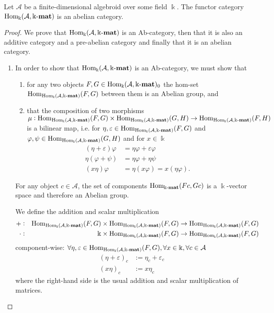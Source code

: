 \begin{theorem}\label{thm:functor_category_abelian}
Let $\mathcal{A}$ be a finite-dimensional algebroid over some field $\Bbbk$. The functor category $\mathrm{Hom_{\Bbbk}}(\mathcal{A},\Bbbk\textnormal{-}\mathbf{mat})$
is an abelian category.
\end{theorem}
\begin{proof}
We prove that $\mathrm{Hom_{\Bbbk}}(\mathcal{A},\Bbbk\textnormal{-}\mathbf{mat})$ is an Ab-category, then that it is also an additive category and a pre-abelian category and finally that
it is an abelian category.
\begin{enumerate}
\renewcommand{\labelenumi}{(\theenumi)}
\item In order to show that $\mathrm{Hom_{\Bbbk}}(\mathcal{A},\Bbbk\textnormal{-}\mathbf{mat})$ is an Ab-category, we must show that 
\begin{enumerate}
\renewcommand{\labelenumii}{(\roman{enumii})}
\item for any two objects $F,G \in \mathrm{Hom_{\Bbbk}}(\mathcal{A},\Bbbk\textnormal{-}\mathbf{mat})_{0}$ the hom-set $\mathrm{Hom}_{\mathrm{Hom_{\Bbbk}}(\mathcal{A},\Bbbk\textnormal{-}\mathbf{mat})}(F,G)$ between them is an Abelian group, and
\item that the composition of two morphisms\\
$\mu : \mathrm{Hom}_{\mathrm{Hom_{\Bbbk}}(\mathcal{A},\Bbbk\textnormal{-}\mathbf{mat})}(F,G) \times \mathrm{Hom}_{\mathrm{Hom_{\Bbbk}}(\mathcal{A},\Bbbk\textnormal{-}\mathbf{mat})}(G,H) \rightarrow \mathrm{Hom}_{\mathrm{Hom_{\Bbbk}}(\mathcal{A},\Bbbk\textnormal{-}\mathbf{mat})}(F,H)$ is a
bilinear map, i.e. for $\eta, \varepsilon \in \mathrm{Hom}_{\mathrm{Hom_{\Bbbk}}(\mathcal{A},\Bbbk\textnormal{-}\mathbf{mat})}(F,G)$ and $\varphi, \psi \in \mathrm{Hom}_{\mathrm{Hom_{\Bbbk}}(\mathcal{A},\Bbbk\textnormal{-}\mathbf{mat})}(G,H)$ and
for $x \in \Bbbk$
\begin{align}
(\eta + \varepsilon)\varphi &= \eta\varphi + \varepsilon\varphi \\
\eta(\varphi + \psi) &= \eta\varphi + \eta\psi \\
(x\eta)\varphi &= \eta(x\varphi) = x(\eta\varphi).
\end{align}
\end{enumerate}

\begin{subproof}[Proof of (i)]
For any object $c \in \mathcal{A}$, the set of components $\mathrm{Hom}_{\Bbbk\textnormal{-}\mathbf{mat}}(Fc,Gc)$ is a $\Bbbk$-vector space and therefore an
Abelian group.

We define the addition and scalar multiplication
\begin{align*}
+ :&& \mathrm{Hom}_{\mathrm{Hom_{\Bbbk}}(\mathcal{A},\Bbbk\textnormal{-}\mathbf{mat})}(F,G) &\times \mathrm{Hom}_{\mathrm{Hom_{\Bbbk}}(\mathcal{A},\Bbbk\textnormal{-}\mathbf{mat})}(F,G) \rightarrow \mathrm{Hom}_{\mathrm{Hom_{\Bbbk}}(\mathcal{A},\Bbbk\textnormal{-}\mathbf{mat})}(F,G)\\
\cdot :&& \Bbbk &\times \mathrm{Hom}_{\mathrm{Hom_{\Bbbk}}(\mathcal{A},\Bbbk\textnormal{-}\mathbf{mat})}(F,G) \rightarrow \mathrm{Hom}_{\mathrm{Hom_{\Bbbk}}(\mathcal{A},\Bbbk\textnormal{-}\mathbf{mat})}(F,G)
\end{align*}
component-wise: $\forall \eta, \varepsilon \in \mathrm{Hom}_{\mathrm{Hom_{\Bbbk}}(\mathcal{A},\Bbbk\textnormal{-}\mathbf{mat})}(F,G), \forall x \in \Bbbk, \forall c \in \mathcal{A}$
\begin{align}
(\eta+\varepsilon)_{c} &:= \eta_{c} + \varepsilon_{c}\\
(x \eta)_{c} &:= x\eta_{c}
\end{align}
where the right-hand side is the usual addition and scalar multiplication of matrices.


\end{subproof}
\end{enumerate}
\end{proof}
